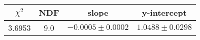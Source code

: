 \begin{tabular}{|c|c|c|c|}

\hline
$\chi^{2}$ & NDF & slope & y-intercept  \\
\hline
3.6953 & 9.0 & $-0.0005\pm0.0002$ & $1.0488\pm0.0298$ \\
\hline

\end{tabular}